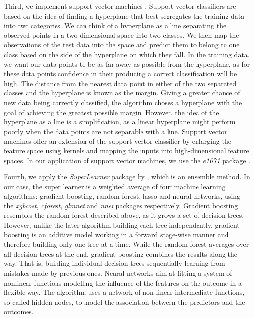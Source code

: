\documentclass[a4paper,11pt]{article}
\begin{document}
	Third, we implement support vector machines \citep[][]{cortes1995support}. Support vector classifiers are based on the idea of finding a hyperplane that best segregates the training data into two categories. We can think of a hyperplane as a line separating the observed points in a two-dimensional space into two classes. We then map the observations of the test data into the space and predict them to belong to one class based on the side of the hyperplane on which they fall. In the training data, we want our data points to be as far away as possible from the hyperplane, as for these data points confidence in their producing a correct classification will be high. The distance from the nearest data point in either of the two separated classes and the hyperplane is known as the margin. Giving a greater chance of new data being correctly classified, the algorithm choses a hyperplane with the goal of achieving the greatest possible margin. However, the idea of the hyperplane as a line is a simplification, as a linear hyperplane might perform poorly when the data points are not separable with a line. Support vector machines offer an extension of the support vector classifier by enlarging the feature space using kernels and mapping the inputs into high-dimensional feature spaces. In our application of support vector machines, we use the \textit{e1071} package \cite{meyer2015support}.
	
	Fourth, we apply the \textit{SuperLearner} package by \cite{Laan2008}, which is an ensemble method. In our case, the super learner is a weighted average of four machine learning algorithms: gradient boosting, random forest, lasso and neural networks, using the \textit{xgboost}, \textit{cforest}, \textit{glmnet} and \textit{nnet} packages respectively. Gradient boosting resembles the random forest described above, as it grows a set of decision trees. However, unlike the later algorithm building each tree independently, gradient boosting is an additive model working in a forward stage-wise manner and therefore building only one tree at a time. While the random forest averages over all decision trees at the end, gradient boosting combines the results along the way. That is, building individual decision trees sequentially learning from mistakes made by previous ones. Neural networks aim at fitting a system of nonlinear functions modelling the influence of the features on the outcome in a flexible way. The algorithm uses a network of non-linear intermediate functions, so-called hidden nodes, to model the association between the predictors and the outcomes. 
	
\end{document}
